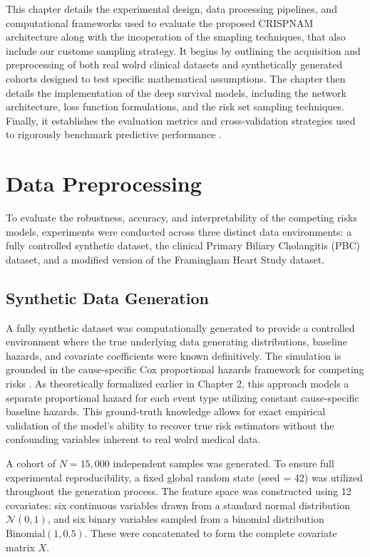 \documentclass[a4paper,twoside,12pt]{report}
\begin{document}
This chapter details the experimental design, data processing pipelines, and computational frameworks used to evaluate the proposed CRISPNAM architecture along with the  incoperation of the smapling techniques, that also include our custome sampling strategy. It begins by outlining the acquisition and preprocessing of both real wolrd clinical datasets and synthetically generated cohorts designed to test specific mathematical assumptions. The chapter then details the implementation of the deep survival models, including the network architecture, loss function formulations, and the risk set sampling techniques. Finally, it establishes the evaluation metrics and cross-validation strategies used to rigorously benchmark predictive performance .

\section{Data Preprocessing}

To evaluate the robustness, accuracy, and interpretability of the competing risks models, experiments were conducted across three distinct data environments: a fully controlled synthetic dataset, the clinical Primary Biliary Cholangitis (PBC) dataset, and a modified version of the Framingham Heart Study dataset.

\subsection{Synthetic Data Generation}
A fully synthetic dataset was computationally generated to provide a controlled environment where the true underlying data generating distributions, baseline hazards, and covariate coefficients were known definitively. The simulation is grounded in the cause-specific Cox proportional hazards framework for competing risks \citep{Cox1972, prentice1978analysis}. As theoretically formalized earlier in Chapter 2, this approach models a separate proportional hazard for each event type utilizing constant cause-specific baseline hazards. This ground-truth knowledge allows for exact empirical validation of the model's ability to recover true risk estimators without the confounding variables inherent to real wolrd medical data.

A cohort of $N = 15,000$ independent samples was generated. To ensure full experimental reproducibility, a fixed global random state (seed = 42) was utilized throughout the generation process. The feature space was constructed using 12 covariates: six continuous variables drawn from a standard normal distribution $\mathcal{N}(0, 1)$, and six binary variables sampled from a binomial distribution $\text{Binomial}(1, 0.5)$. These were concatenated to form the complete covariate matrix $X$.
\end{document}
